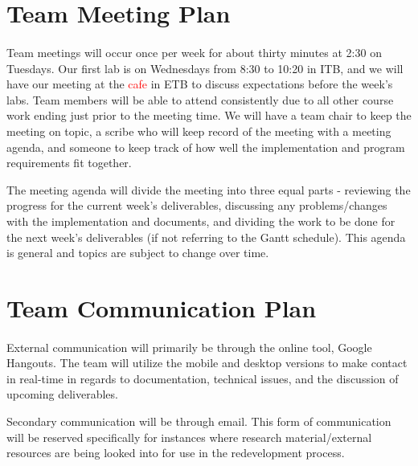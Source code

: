 \documentclass{article}
\begin{document}
\section{Team Meeting Plan}

\paragraph{}

Team meetings will occur once per week for about thirty minutes at 2:30 on Tuesdays. Our first lab is on Wednesdays from 8:30 to 10:20 in ITB, and we will have our meeting at the \textcolor{red}{cafe} in ETB to discuss expectations before the week's labs. Team members will be able to attend consistently due to all other course work ending just prior to the meeting time. We will have a team chair to keep the meeting on topic, a scribe who will keep record of the meeting with a meeting agenda, and someone to keep track of how well the implementation and program requirements fit together.\par The meeting agenda will divide the meeting into three equal parts - reviewing the progress for the current week's deliverables, discussing any problems/changes with the implementation and documents, and dividing the work to be done for the next week's deliverables (if not referring to the Gantt schedule). This agenda is general and topics are subject to change over time.

\section{Team Communication Plan}

\paragraph{}
External communication will primarily be through the online tool, Google Hangouts. The team will utilize the mobile and desktop versions to make contact in real-time in regards to documentation, technical issues, and the discussion of upcoming deliverables.\par Secondary communication will be through email. This form of communication will be reserved specifically for instances where research material/external resources are being looked into for use in the redevelopment process.
\end{document}
